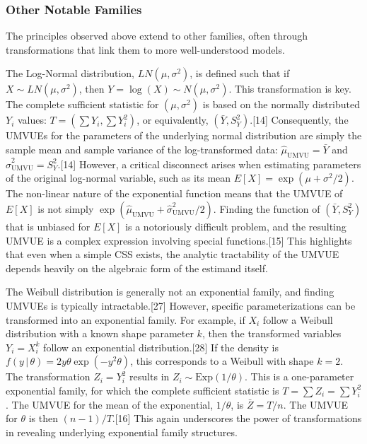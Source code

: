 \documentclass[11pt, letterpaper]{article}
\newcommand{\given}{\,|\,}
\begin{document}
\subsubsection*{Other Notable Families}
The principles observed above extend to other families, often through transformations that link them to more well-understood models.

The Log-Normal distribution, $LN(\mu, \sigma^2)$, is defined such that if $X \sim LN(\mu, \sigma^2)$, then $Y=\log(X) \sim N(\mu, \sigma^2)$. This transformation is key. The complete sufficient statistic for $(\mu, \sigma^2)$ is based on the normally distributed $Y_i$ values: $T=(\sum Y_i, \sum Y_i^2)$, or equivalently, $(\bar{Y}, S_Y^2)$.[14] Consequently, the UMVUEs for the parameters of the underlying normal distribution are simply the sample mean and sample variance of the log-transformed data: $\hat{\mu}_{\text{UMVU}} = \bar{Y}$ and $\hat{\sigma}^2_{\text{UMVU}} = S_Y^2$.[14] However, a critical disconnect arises when estimating parameters of the original log-normal variable, such as its mean $E[X] = \exp(\mu+\sigma^2/2)$. The non-linear nature of the exponential function means that the UMVUE of $E[X]$ is not simply $\exp(\hat{\mu}_{\text{UMVU}} + \hat{\sigma}^2_{\text{UMVU}}/2)$. Finding the function of $(\bar{Y}, S_Y^2)$ that is unbiased for $E[X]$ is a notoriously difficult problem, and the resulting UMVUE is a complex expression involving special functions.[15] This highlights that even when a simple CSS exists, the analytic tractability of the UMVUE depends heavily on the algebraic form of the estimand itself.

The Weibull distribution is generally not an exponential family, and finding UMVUEs is typically intractable.[27] However, specific parameterizations can be transformed into an exponential family. For example, if $X_i$ follow a Weibull distribution with a known shape parameter $k$, then the transformed variables $Y_i = X_i^k$ follow an exponential distribution.[28] If the density is $f(y \given \theta) = 2y\theta \exp(-y^2\theta)$, this corresponds to a Weibull with shape $k=2$. The transformation $Z_i = Y_i^2$ results in $Z_i \sim \text{Exp}(1/\theta)$. This is a one-parameter exponential family, for which the complete sufficient statistic is $T=\sum Z_i = \sum Y_i^2$. The UMVUE for the mean of the exponential, $1/\theta$, is $\bar{Z}=T/n$. The UMVUE for $\theta$ is then $(n-1)/T$.[16] This again underscores the power of transformations in revealing underlying exponential family structures.
\end{document}
